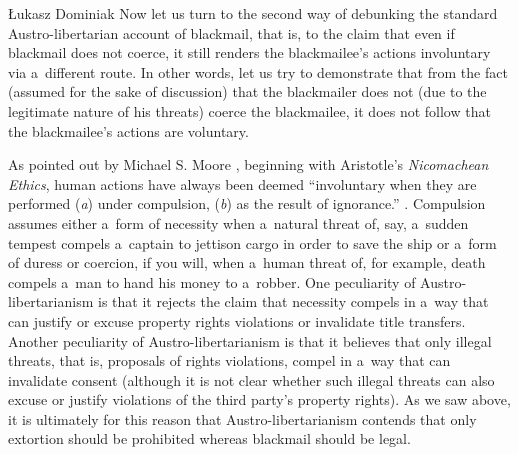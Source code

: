 \begin{artengenv}{Łukasz Dominiak}
Now let us turn to the second way of debunking the standard Austro-libertarian account of blackmail, that is, to the claim that even if blackmail does not coerce, it still renders the blackmailee's actions involuntary via a~different route. In other words, let us try to demonstrate that from the fact (assumed for the sake of discussion) that the blackmailer does not (due to the legitimate nature of his threats) coerce the blackmailee, it does not follow that the blackmailee's actions are voluntary.



As pointed out by Michael S. Moore 
\parencite*[][p.85]{moore_law_1984}, %
 beginning with Aristotle's \textit{Nicomachean Ethics}, human actions have always been deemed ``involuntary when they are performed (\textit{a}) under compulsion, (\textit{b}) as the result of ignorance.'' 
\parencite[p.~77\ \mbox{[Book III, Chap.~I, 1110a]}]{aristotle_nicomachean_1955}. %
 Compulsion assumes either a~form of necessity when a~natural threat of, say, a~sudden tempest compels a~captain to jettison cargo in order to save the ship or a~form of duress or coercion, if you will, when a~human threat of, for example, death compels a~man to hand his money to a~robber. One peculiarity of Austro-libertarianism is that it rejects the claim that necessity compels in a~way that can justify or excuse property rights violations or invalidate title transfers. Another peculiarity of Austro-libertarianism is that it believes that only illegal threats, that is, proposals of rights violations, compel in a~way that can invalidate consent (although it is not clear whether such illegal threats can also excuse or justify violations of the third party's property rights). As we saw above, it is ultimately for this reason that Austro-libertarianism contends that only extortion should be prohibited whereas blackmail should be legal.




\end{artengenv}
